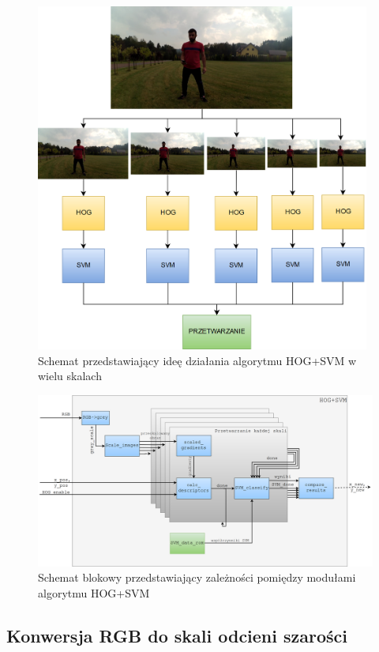 \begin{figure}[h]
	\centering
	\captionsetup{justification=centering,margin=1cm}
	\includegraphics[width=11cm]{Scaling.png}
	\caption{Schemat przedstawiający ideę działania algorytmu HOG+SVM w wielu skalach}
	\label{fig:HOG_SVM_scheme_scaling}
\end{figure}

\begin{figure}[h]
	\centering
	\includegraphics[width=16cm]{HOG_SVM.png}
	\captionsetup{justification=centering,margin=1cm}
	\caption{Schemat blokowy przedstawiający zależności pomiędzy modułami algorytmu HOG+SVM}
	\label{fig:HOG_SVM_scheme}
\end{figure}

\subsection{Konwersja RGB do skali odcieni szarości}

